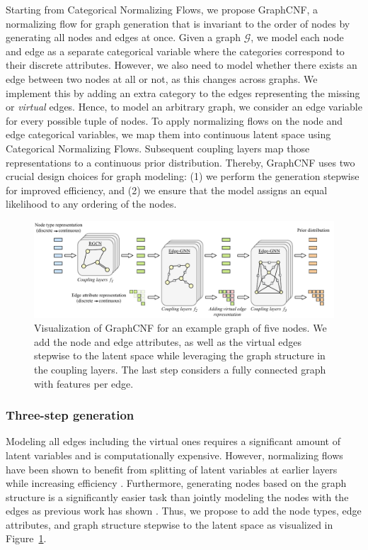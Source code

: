 Starting from Categorical Normalizing Flows, we propose GraphCNF, a normalizing flow for graph generation that is invariant to the order of nodes by generating all nodes and edges at once.
Given a graph $\mathcal{G}$, we model each node and edge as a separate categorical variable where the categories correspond to their discrete attributes. 
However, we also need to model whether there exists an edge between two nodes at all or not, as this changes across graphs. 
We implement this by adding an extra category to the edges representing the missing or \textit{virtual} edges. 
Hence, to model an arbitrary graph, we consider an edge variable for every possible tuple of nodes.
To apply normalizing flows on the node and edge categorical variables, we map them into continuous latent space using Categorical Normalizing Flows. 
Subsequent coupling layers map those representations to a continuous prior distribution.
Thereby, GraphCNF uses two crucial design choices for graph modeling: (1) we perform the generation stepwise for improved efficiency, and (2) we ensure that the model assigns an equal likelihood to any ordering of the nodes.

\begin{figure}[t!]
	\centering
	\includegraphics[width=\textwidth]{figures/methodology_figures/GraphCNF.pdf}
	\caption[Model architecture of GraphCNF]{Visualization of GraphCNF for an example graph of five nodes. We add the node and edge attributes, as well as the virtual edges stepwise to the latent space while leveraging the graph structure in the coupling layers. The last step considers a fully connected graph with features per edge.
	}
	\label{fig:methodology_graph_flow}
\end{figure}

\subsubsection{Three-step generation}
Modeling all edges including the virtual ones requires a significant amount of latent variables and is computationally expensive.
However, normalizing flows have been shown to benefit from splitting of latent variables at earlier layers while increasing efficiency \cite{RealNVP, Glow}. 
Furthermore, generating nodes based on the graph structure is a significantly easier task than jointly modeling the nodes with the edges as previous work has shown \cite{GraphNVP}.
Thus, we propose to add the node types, edge attributes, and graph structure stepwise to the latent space as visualized in Figure~\ref{fig:methodology_graph_flow}. 

